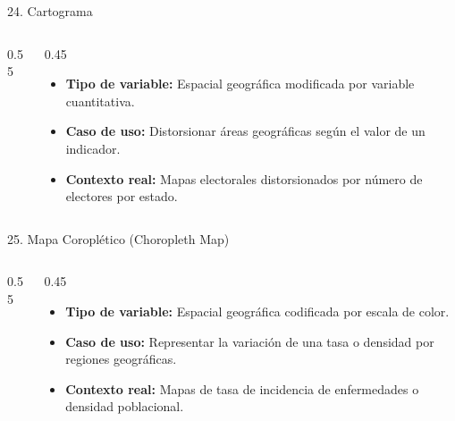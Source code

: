 \documentclass[aspectratio=169,10pt]{beamer}
\begin{document}
\begin{frame}{24. Cartograma}
\begin{columns}
\begin{column}{0.55\textwidth}
\end{column}
\begin{column}{0.45\textwidth}
\begin{itemize}\small
\item \textbf{Tipo de variable:} Espacial geográfica modificada por variable cuantitativa.
\item \textbf{Caso de uso:} Distorsionar áreas geográficas según el valor de un indicador.
\item \textbf{Contexto real:} Mapas electorales distorsionados por número de electores por estado.
\end{itemize}
\end{column}
\end{columns}
\end{frame}

\begin{frame}{25. Mapa Coroplético (Choropleth Map)}
\begin{columns}
\begin{column}{0.55\textwidth}
\end{column}
\begin{column}{0.45\textwidth}
\begin{itemize}\small
\item \textbf{Tipo de variable:} Espacial geográfica codificada por escala de color.
\item \textbf{Caso de uso:} Representar la variación de una tasa o densidad por regiones geográficas.
\item \textbf{Contexto real:} Mapas de tasa de incidencia de enfermedades o densidad poblacional.
\end{itemize}
\end{column}
\end{columns}
\end{frame}
\end{document}
